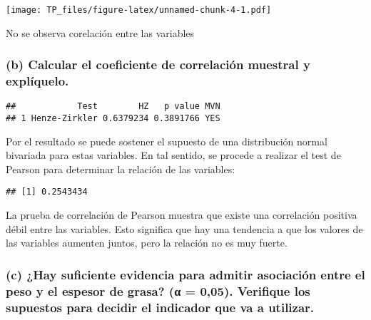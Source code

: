 \documentclass[
]{article}
\newenvironment{Shaded}{\begin{snugshade}}{\end{snugshade}}
\newcommand{\AttributeTok}[1]{\textcolor[rgb]{0.77,0.63,0.00}{#1}}
\newcommand{\FunctionTok}[1]{\textcolor[rgb]{0.00,0.00,0.00}{#1}}
\newcommand{\NormalTok}[1]{#1}
\newcommand{\OtherTok}[1]{\textcolor[rgb]{0.56,0.35,0.01}{#1}}
\newcommand{\SpecialCharTok}[1]{\textcolor[rgb]{0.00,0.00,0.00}{#1}}
\newcommand{\StringTok}[1]{\textcolor[rgb]{0.31,0.60,0.02}{#1}}
\begin{document}
\texttt{[image: TP\_files/figure-latex/unnamed-chunk-4-1.pdf]}

No se observa corelación entre las variables

\hypertarget{b-calcular-el-coeficiente-de-correlaciuxf3n-muestral-y-expluxedquelo.}{%
\subsubsection{(b) Calcular el coeficiente de correlación muestral y
explíquelo.}\label{b-calcular-el-coeficiente-de-correlaciuxf3n-muestral-y-expluxedquelo.}}

\begin{Shaded}
\end{Shaded}

\begin{verbatim}
##            Test        HZ   p value MVN
## 1 Henze-Zirkler 0.6379234 0.3891766 YES
\end{verbatim}

Por el resultado se puede sostener el supuesto de una distribución
normal bivariada para estas variables. En tal sentido, se procede a
realizar el test de Pearson para determinar la relación de las
variables:

\begin{Shaded}
\end{Shaded}

\begin{verbatim}
## [1] 0.2543434
\end{verbatim}

La prueba de correlación de Pearson muestra que existe una correlación
positiva débil entre las variables. Esto significa que hay una tendencia
a que los valores de las variables aumenten juntos, pero la relación no
es muy fuerte.

\hypertarget{c-hay-suficiente-evidencia-para-admitir-asociaciuxf3n-entre-el-peso-y-el-espesor-de-grasa-ux3b1-005.-verifique-los-supuestos-para-decidir-el-indicador-que-va-a-utilizar.}{%
\subsubsection{(c) ¿Hay suficiente evidencia para admitir asociación
entre el peso y el espesor de grasa? (α = 0,05). Verifique los supuestos
para decidir el indicador que va a
utilizar.}\label{c-hay-suficiente-evidencia-para-admitir-asociaciuxf3n-entre-el-peso-y-el-espesor-de-grasa-ux3b1-005.-verifique-los-supuestos-para-decidir-el-indicador-que-va-a-utilizar.}}
\end{document}

